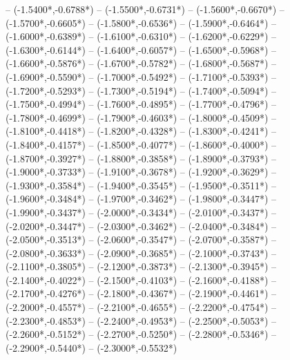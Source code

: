 {	-- ({-1.5400*\dx},{-0.6788*\dy})
	-- ({-1.5500*\dx},{-0.6731*\dy})
	-- ({-1.5600*\dx},{-0.6670*\dy})
	-- ({-1.5700*\dx},{-0.6605*\dy})
	-- ({-1.5800*\dx},{-0.6536*\dy})
	-- ({-1.5900*\dx},{-0.6464*\dy})
	-- ({-1.6000*\dx},{-0.6389*\dy})
	-- ({-1.6100*\dx},{-0.6310*\dy})
	-- ({-1.6200*\dx},{-0.6229*\dy})
	-- ({-1.6300*\dx},{-0.6144*\dy})
	-- ({-1.6400*\dx},{-0.6057*\dy})
	-- ({-1.6500*\dx},{-0.5968*\dy})
	-- ({-1.6600*\dx},{-0.5876*\dy})
	-- ({-1.6700*\dx},{-0.5782*\dy})
	-- ({-1.6800*\dx},{-0.5687*\dy})
	-- ({-1.6900*\dx},{-0.5590*\dy})
	-- ({-1.7000*\dx},{-0.5492*\dy})
	-- ({-1.7100*\dx},{-0.5393*\dy})
	-- ({-1.7200*\dx},{-0.5293*\dy})
	-- ({-1.7300*\dx},{-0.5194*\dy})
	-- ({-1.7400*\dx},{-0.5094*\dy})
	-- ({-1.7500*\dx},{-0.4994*\dy})
	-- ({-1.7600*\dx},{-0.4895*\dy})
	-- ({-1.7700*\dx},{-0.4796*\dy})
	-- ({-1.7800*\dx},{-0.4699*\dy})
	-- ({-1.7900*\dx},{-0.4603*\dy})
	-- ({-1.8000*\dx},{-0.4509*\dy})
	-- ({-1.8100*\dx},{-0.4418*\dy})
	-- ({-1.8200*\dx},{-0.4328*\dy})
	-- ({-1.8300*\dx},{-0.4241*\dy})
	-- ({-1.8400*\dx},{-0.4157*\dy})
	-- ({-1.8500*\dx},{-0.4077*\dy})
	-- ({-1.8600*\dx},{-0.4000*\dy})
	-- ({-1.8700*\dx},{-0.3927*\dy})
	-- ({-1.8800*\dx},{-0.3858*\dy})
	-- ({-1.8900*\dx},{-0.3793*\dy})
	-- ({-1.9000*\dx},{-0.3733*\dy})
	-- ({-1.9100*\dx},{-0.3678*\dy})
	-- ({-1.9200*\dx},{-0.3629*\dy})
	-- ({-1.9300*\dx},{-0.3584*\dy})
	-- ({-1.9400*\dx},{-0.3545*\dy})
	-- ({-1.9500*\dx},{-0.3511*\dy})
	-- ({-1.9600*\dx},{-0.3484*\dy})
	-- ({-1.9700*\dx},{-0.3462*\dy})
	-- ({-1.9800*\dx},{-0.3447*\dy})
	-- ({-1.9900*\dx},{-0.3437*\dy})
	-- ({-2.0000*\dx},{-0.3434*\dy})
	-- ({-2.0100*\dx},{-0.3437*\dy})
	-- ({-2.0200*\dx},{-0.3447*\dy})
	-- ({-2.0300*\dx},{-0.3462*\dy})
	-- ({-2.0400*\dx},{-0.3484*\dy})
	-- ({-2.0500*\dx},{-0.3513*\dy})
	-- ({-2.0600*\dx},{-0.3547*\dy})
	-- ({-2.0700*\dx},{-0.3587*\dy})
	-- ({-2.0800*\dx},{-0.3633*\dy})
	-- ({-2.0900*\dx},{-0.3685*\dy})
	-- ({-2.1000*\dx},{-0.3743*\dy})
	-- ({-2.1100*\dx},{-0.3805*\dy})
	-- ({-2.1200*\dx},{-0.3873*\dy})
	-- ({-2.1300*\dx},{-0.3945*\dy})
	-- ({-2.1400*\dx},{-0.4022*\dy})
	-- ({-2.1500*\dx},{-0.4103*\dy})
	-- ({-2.1600*\dx},{-0.4188*\dy})
	-- ({-2.1700*\dx},{-0.4276*\dy})
	-- ({-2.1800*\dx},{-0.4367*\dy})
	-- ({-2.1900*\dx},{-0.4461*\dy})
	-- ({-2.2000*\dx},{-0.4557*\dy})
	-- ({-2.2100*\dx},{-0.4655*\dy})
	-- ({-2.2200*\dx},{-0.4754*\dy})
	-- ({-2.2300*\dx},{-0.4853*\dy})
	-- ({-2.2400*\dx},{-0.4953*\dy})
	-- ({-2.2500*\dx},{-0.5053*\dy})
	-- ({-2.2600*\dx},{-0.5152*\dy})
	-- ({-2.2700*\dx},{-0.5250*\dy})
	-- ({-2.2800*\dx},{-0.5346*\dy})
	-- ({-2.2900*\dx},{-0.5440*\dy})
	-- ({-2.3000*\dx},{-0.5532*\dy})
}
